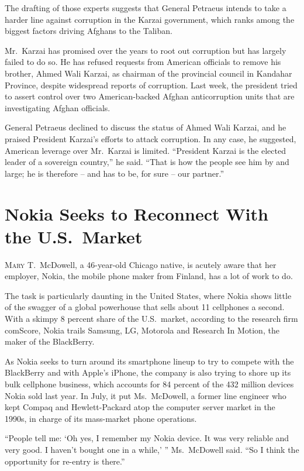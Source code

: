 ﻿\documentclass[12pt]{article}
\begin{document}
The drafting of those experts suggests that General Petraeus intends to take a harder line against
corruption in the Karzai government, which ranks among the biggest factors driving Afghans to the
Taliban.

Mr.~Karzai has promised over the years to root out corruption but has largely failed to do so. He
has refused requests from American officials to remove his brother, Ahmed Wali Karzai, as chairman
of the provincial council in Kandahar Province, despite widespread reports of corruption. Last week,
the president tried to assert control over two American-backed Afghan anticorruption units that are
investigating Afghan officials.

General Petraeus declined to discuss the status of Ahmed Wali Karzai, and he praised President
Karzai's efforts to attack corruption. In any case, he suggested, American leverage over Mr.~Karzai
is limited. ``President Karzai is the elected leader of a sovereign country,'' he said. ``That is
how the people see him by and large; he is therefore -- and has to be, for sure -- our partner.''

\section{Nokia Seeks to Reconnect With the U.S.~Market}

\lettrine{M}{ary} T.~McDowell, a 46-year-old Chicago native, is acutely
aware that her employer, Nokia, the mobile phone maker from Finland, has a lot of work to do.

The task is particularly daunting in the United States, where Nokia shows little of the swagger of a
global powerhouse that sells about 11 cellphones a second. With a skimpy 8 percent share of the
U.S.~market, according to the research firm comScore, Nokia trails Samsung, LG, Motorola and
Research In Motion, the maker of the BlackBerry.

As Nokia seeks to turn around its smartphone lineup to try to compete with the BlackBerry and with
Apple's iPhone, the company is also trying to shore up its bulk cellphone business, which accounts
for 84 percent of the 432 million devices Nokia sold last year. In July, it put Ms.~McDowell, a
former line engineer who kept Compaq and Hewlett-Packard atop the computer server market in the
1990s, in charge of its mass-market phone operations.

``People tell me: `Oh yes, I remember my Nokia device. It was very reliable and very good. I haven't
bought one in a while,' '' Ms.~McDowell said. ``So I think the opportunity for re-entry is there.''
\end{document}

